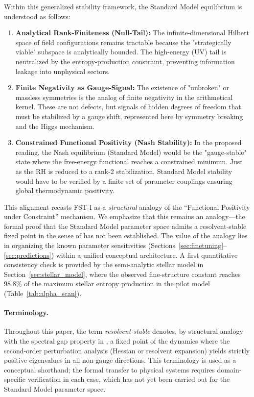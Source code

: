 \documentclass[12pt,a4paper]{article}
\theoremstyle{remark}
\begin{document}
Within this generalized stability framework, the Standard Model equilibrium is understood as follows:
\begin{enumerate}[label=\alph*)]
    \item \textbf{Analytical Rank-Finiteness (Null-Tail):} The infinite-dimensional Hilbert space of field configurations remains tractable because the "strategically viable" subspace is analytically bounded. The high-energy (UV) tail is neutralized by the entropy-production constraint, preventing information leakage into unphysical sectors.
    \item \textbf{Finite Negativity as Gauge-Signal:} The existence of "unbroken" or massless symmetries is the analog of finite negativity in the arithmetical kernel. These are not defects, but signals of hidden degrees of freedom that must be stabilized by a gauge shift, represented here by symmetry breaking and the Higgs mechanism.
    \item \textbf{Constrained Functional Positivity (Nash Stability):} In the proposed reading, the Nash equilibrium (Standard Model) would be the "gauge-stable" state where the free-energy functional reaches a constrained minimum. Just as the RH is reduced to a rank-2 stabilization, Standard Model stability would have to be verified by a finite set of parameter couplings ensuring global thermodynamic positivity.
\end{enumerate}

This alignment recasts FST-I as a \emph{structural} analogy of the ``Functional Positivity under Constraint'' mechanism. We emphasize that this remains an analogy---the formal proof that the Standard Model parameter space admits a resolvent-stable fixed point in the sense of \citep{GeigerRH2026b} has not been established. The value of the analogy lies in organizing the known parameter sensitivities (Sections~\ref{sec:finetuning}--\ref{sec:predictions}) within a unified conceptual architecture. A first quantitative consistency check is provided by the semi-analytic stellar model in Section~\ref{sec:stellar_model}, where the observed fine-structure constant reaches 98.8\% of the maximum stellar entropy production in the pilot model (Table~\ref{tab:alpha_scan}).

\paragraph{Terminology.} Throughout this paper, the term \emph{resolvent-stable} denotes, by structural analogy with the spectral gap property in \citep{GeigerRH2026b}, a fixed point of the dynamics where the second-order perturbation analysis (Hessian or resolvent expansion) yields strictly positive eigenvalues in all non-gauge directions. This terminology is used as a conceptual shorthand; the formal transfer to physical systems requires domain-specific verification in each case, which has not yet been carried out for the Standard Model parameter space.
\end{document}

